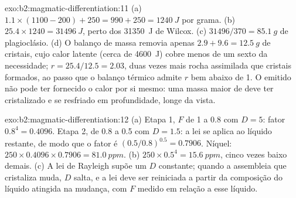 \begin{solution}{exo:b2:magmatic-differentiation:11}
(a) $1.1\times(1100 - 200) + 250 = 990 + 250 = \qty{1240}{J}$ por grama. (b)
$25.4\times1240 = \qty{31496}{J}$, perto dos \qty{31350}{J} de Wilcox. (c)
$31496/370 = \qty{85.1}{g}$ de plagioclásio. (d) O balanço de massa removia apenas $2.9 +
9.6 = \qty{12.5}{g}$ de cristais, cujo calor latente (cerca de \qty{4600}{J}) cobre menos
de um sexto da necessidade; $r = 25.4/12.5 = 2.03$, duas vezes mais rocha assimilada que
cristais formados, ao passo que o balanço térmico admite $r$ bem abaixo de 1. O  emitido
não pode ter fornecido o calor por si mesmo: uma massa maior de  deve ter cristalizado
e se resfriado em profundidade, longe da vista.
\end{solution}

\begin{solution}{exo:b2:magmatic-differentiation:12}
(a) Etapa 1, $F$ de 1 a 0.8 com $D = 5$: fator $0.8^{4} = 0.4096$. Etapa 2,
de 0.8 a 0.5 com $D = 1.5$: a lei se aplica ao líquido restante, de modo que o
fator é $(0.5/0.8)^{0.5} = 0.7906$. Níquel: $250\times0.4096\times0.7906 =
\qty{81.0}{ppm}$. (b) $250\times0.5^{4} = \qty{15.6}{ppm}$, cinco vezes baixo demais. (c)
A lei de Rayleigh supõe um $D$ constante; quando a assembleia que cristaliza muda,
$D$ salta, e a lei deve ser reiniciada a partir da composição do líquido atingida na
mudança, com $F$ medido em relação a esse líquido.
\end{solution}

